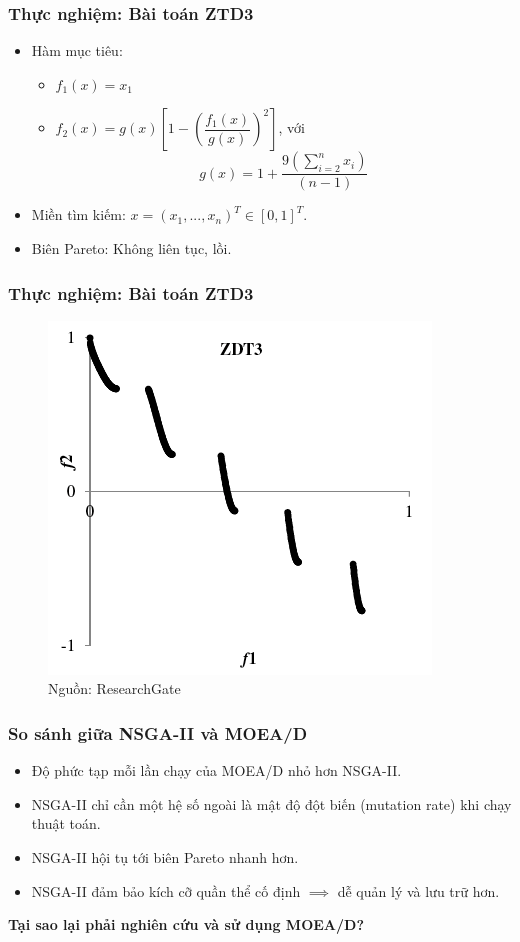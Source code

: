 \documentclass{beamer}
\begin{document}

    \begin{frame}
    \frametitle{\textbf{Thực nghiệm: Bài toán ZTD3}}
        \begin{itemize}
            \item Hàm mục tiêu:
            \begin{itemize}
                \item $ f_1(x) = x_1 $
                \item $ f_2(x) = g(x) \left[ 1 - \left( \dfrac{f_1(x)}{g(x)} \right)^2 \right] $, với
                $$ g(x) = 1 +\dfrac{9 \left( \sum\limits_{i = 2}^n x_i \right)}{(n - 1)} $$
            \end{itemize}
            \item Miền tìm kiếm: $ x = (x_1,..., x_n)^T \in \left[0, 1\right]^T $.
            \item Biên Pareto: Không liên tục, lồi.
        \end{itemize}
    \end{frame}

    \begin{frame} 
    \frametitle{\textbf{Thực nghiệm: Bài toán ZTD3}}
        \begin{figure}[!h]
            \center
            \includegraphics[width=0.5\linewidth]{zdt3-pf}
            \caption{Nguồn: ResearchGate}
        \end{figure}

    \end{frame}

    
    \begin{frame}
    \frametitle{\textbf{So sánh giữa NSGA-II và MOEA/D}}
        \begin{itemize}
            \item Độ phức tạp mỗi lần chạy của MOEA/D nhỏ hơn NSGA-II. \pause
            \item NSGA-II chỉ cần một hệ số ngoài là mật độ đột biến (mutation rate) khi chạy thuật toán. \pause
            \item NSGA-II hội tụ tới biên Pareto nhanh hơn. \pause
            \item NSGA-II đảm bảo kích cỡ quần thể cố định $\implies$ dễ quản lý và lưu trữ hơn. \pause
        \end{itemize}
        \textbf{Tại sao lại phải nghiên cứu và sử dụng MOEA/D?}
    \end{frame}
\end{document}
